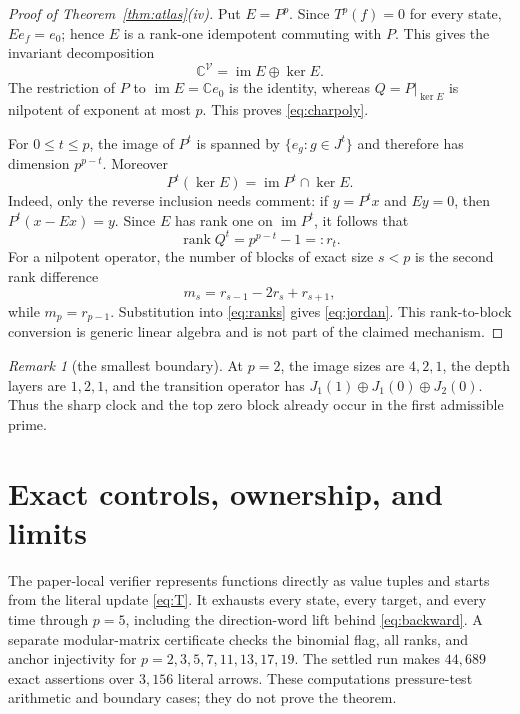 \documentclass[a4paper,10pt]{amsart}
\theoremstyle{remark}
\newtheorem{remark}[theorem]{Remark}
\newcommand{\cV}{\mathcal V}
\newcommand{\im}{\operatorname{im}}
\newcommand{\rank}{\operatorname{rank}}
\begin{document}
\begin{proof}[Proof of Theorem~\ref{thm:atlas}(iv)]
Put $E=P^p$.  Since $T^p(f)=0$ for every state, $Ee_f=e_0$; hence $E$ is a
rank-one idempotent commuting with $P$.  This gives the invariant
decomposition
\[
       \mathbb C^{\cV}=\im E\oplus\ker E.
\]
The restriction of $P$ to $\im E=\mathbb C e_0$ is the identity, whereas
$Q=P|_{\ker E}$ is nilpotent of exponent at most $p$.  This proves
\eqref{eq:charpoly}.

For $0\le t\le p$, the image of $P^t$ is spanned by
$\{e_g:g\in J^t\}$ and therefore has dimension $p^{p-t}$.  Moreover
\[
 P^t(\ker E)=\im P^t\cap\ker E.
\]
Indeed, only the reverse inclusion needs comment: if $y=P^tx$ and $Ey=0$,
then $P^t(x-Ex)=y$.  Since $E$ has rank one on $\im P^t$, it follows that
\begin{equation}\label{eq:ranks}
                \rank Q^t=p^{p-t}-1=:r_t.
\end{equation}
For a nilpotent operator, the number of blocks of exact size $s<p$ is the
second rank difference
\[
                   m_s=r_{s-1}-2r_s+r_{s+1},
\]
while $m_p=r_{p-1}$.  Substitution into \eqref{eq:ranks} gives
\eqref{eq:jordan}.  This rank-to-block conversion is generic linear
algebra and is not part of the claimed mechanism.
\end{proof}

\begin{remark}[the smallest boundary]\label{rem:p2}
At $p=2$, the image sizes are $4,2,1$, the depth layers are $1,2,1$, and
the transition operator has $J_1(1)\oplus J_1(0)\oplus J_2(0)$.  Thus the
sharp clock and the top zero block already occur in the first admissible
prime.
\end{remark}

\section{Exact controls, ownership, and limits}

The paper-local verifier represents functions directly as value tuples and
starts from the literal update \eqref{eq:T}.  It exhausts every state, every
target, and every time through $p=5$, including the direction-word lift
behind \eqref{eq:backward}.  A separate modular-matrix certificate checks
the binomial flag, all ranks, and anchor injectivity for
$p=2,3,5,7,11,13,17,19$.  The settled run makes $44{,}689$ exact
assertions over $3{,}156$ literal arrows.  These computations pressure-test
arithmetic and boundary cases; they do not prove the theorem.
\end{document}
